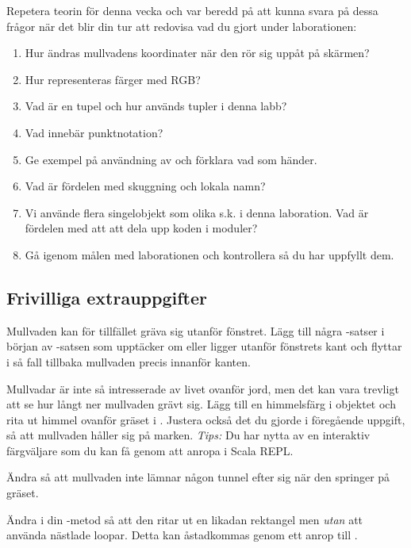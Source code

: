 \noindent Repetera teorin för denna vecka och var beredd på att kunna svara på dessa frågor när det blir din tur att redovisa vad du gjort under laborationen:

\begin{enumerate}[noitemsep]
\item Hur ändras mullvadens koordinater när den rör sig uppåt på skärmen? 
\item Hur representeras färger med RGB?
\item Vad är en tupel och hur används tupler i denna labb?
\item Vad innebär punktnotation?
\item Ge exempel på användning av  och förklara vad som händer.
\item Vad är fördelen med skuggning och lokala namn?
\item Vi använde flera singelobjekt som olika s.k.  i denna laboration. Vad är fördelen med att att dela upp koden i moduler?
\item Gå igenom målen med laborationen och kontrollera så du har uppfyllt dem.
\end{enumerate}





\subsection{Frivilliga extrauppgifter}

\Task
Mullvaden kan för tillfället gräva sig utanför fönstret.
Lägg till några -satser i början av -satsen som upptäcker om  eller  ligger utanför fönstrets kant och flyttar i så fall tillbaka mullvaden precis innanför kanten.

\Task
Mullvadar är inte så intresserade av livet ovanför jord, men det kan vara trevligt att se hur långt ner mullvaden grävt sig.
Lägg till en himmelsfärg i objektet  och rita ut himmel ovanför gräset i .
Justera också det du gjorde i föregående uppgift, så att mullvaden håller sig på marken. \emph{Tips:} Du har nytta av en interaktiv färgväljare som du kan få genom att anropa  i Scala REPL.

\Task
Ändra så att mullvaden inte lämnar någon tunnel efter sig när den springer på gräset.

\Task
Ändra i din -metod så att den ritar ut en likadan rektangel men \emph{utan} att använda nästlade loopar. Detta kan åstadkommas genom ett anrop till .

